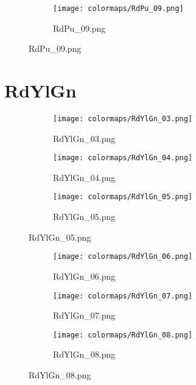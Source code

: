 \documentclass{article}%
\begin{document}
%
\hspace{1cm}\hfill%


\begin{figure}[h!]%
\begin{subfigure}[b]{0.3\linewidth}%
\texttt{[image: colormaps/RdPu\_09.png]}%
\caption{RdPu\_09.png}%
\end{subfigure}%
\end{figure}

%
\newpage%
\section{RdYlGn}%
\label{sec:RdYlGn}%
\hspace{1cm}\hfill%
\hspace{1cm}\hfill%
\hspace{1cm}\hfill%


\begin{figure}[h!]%
\begin{subfigure}[b]{0.3\linewidth}%
\texttt{[image: colormaps/RdYlGn\_03.png]}%
\caption{RdYlGn\_03.png}%
\end{subfigure}%
\begin{subfigure}[b]{0.3\linewidth}%
\texttt{[image: colormaps/RdYlGn\_04.png]}%
\caption{RdYlGn\_04.png}%
\end{subfigure}%
\begin{subfigure}[b]{0.3\linewidth}%
\texttt{[image: colormaps/RdYlGn\_05.png]}%
\caption{RdYlGn\_05.png}%
\end{subfigure}%
\end{figure}

%
\hspace{1cm}\hfill%
\hspace{1cm}\hfill%
\hspace{1cm}\hfill%


\begin{figure}[h!]%
\begin{subfigure}[b]{0.3\linewidth}%
\texttt{[image: colormaps/RdYlGn\_06.png]}%
\caption{RdYlGn\_06.png}%
\end{subfigure}%
\begin{subfigure}[b]{0.3\linewidth}%
\texttt{[image: colormaps/RdYlGn\_07.png]}%
\caption{RdYlGn\_07.png}%
\end{subfigure}%
\begin{subfigure}[b]{0.3\linewidth}%
\texttt{[image: colormaps/RdYlGn\_08.png]}%
\caption{RdYlGn\_08.png}%
\end{subfigure}%
\end{figure}
\end{document}
